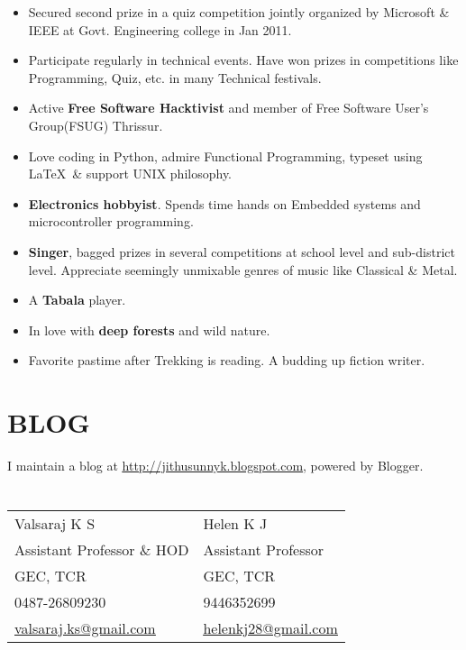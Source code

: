 \begin{resume}
\begin{itemize}
\item Secured second prize in a quiz competition jointly organized by Microsoft \& IEEE at Govt. Engineering college in Jan 2011.
\item Participate regularly in technical events. Have won prizes in competitions like Programming, Quiz, etc. in many Technical festivals.
\item Active \textbf{Free Software Hacktivist} and member of Free Software User's Group(FSUG) Thrissur.
\item Love coding in Python, admire Functional Programming, typeset using \LaTeX\ \& support UNIX philosophy.
\item \textbf{Electronics hobbyist}. Spends time hands on Embedded systems and microcontroller programming.
\item \textbf{Singer}, bagged prizes in several competitions at school level and sub-district level. Appreciate seemingly unmixable genres of music like Classical \& Metal.
\item A \textbf{Tabala} player.
\item In love with \textbf{deep forests} and wild nature.
\item Favorite pastime after Trekking is reading. A budding up fiction writer.
\end{itemize}

\vspace*{+2mm}

\section{\sc \bf \textsf{BLOG}}
I maintain a blog at \href{http://jithusunnyk.blogspot.com}{\underline{http://jithusunnyk.blogspot.com}}, powered by Blogger.

\section{}
\vspace{.05in}
\begin{tabular}{@{}p{2in}p{4in}}
Valsaraj K S   &  Helen K J \\
Assistant Professor \& HOD   & Assistant Professor   \\
GEC, TCR   &  GEC, TCR  \\
0487-26809230 & 9446352699 \\
\href{mailto:valsaraj.ks@gmail.com}{\underline{valsaraj.ks@gmail.com}} & 
\href{mailto:helenkj28@gmail.com}{\underline{helenkj28@gmail.com}}
\end{tabular}

\end{resume}

